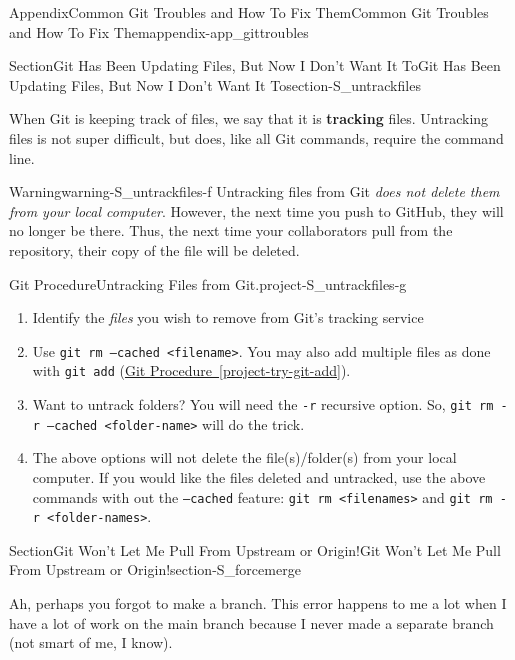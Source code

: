 \documentclass[oneside,10pt,]{book}
\newcommand{\xreffont}{\relax}
\newcommand{\mono}[1]{\texttt{#1}}
\newcommand{\terminology}[1]{\textbf{#1}}
\begin{document}
\begin{appendixptx}{Appendix}{Common Git Troubles and How To Fix Them}{}{Common Git Troubles and How To Fix Them}{}{}{appendix-app_gittroubles}
\begin{sectionptx}{Section}{Git Has Been Updating Files, But Now I Don't Want It To}{}{Git Has Been Updating Files, But Now I Don't Want It To}{}{}{section-S_untrackfiles}
\par
When Git is keeping track of files, we say that it is \terminology{tracking} files. Untracking files is not super difficult, but does, like all Git commands, require the command line.%
\begin{warning}{Warning}{}{warning-S_untrackfiles-f}%
Untracking files from Git \emph{does not delete them from your local computer}. However, the next time you push to GitHub, they will no longer be there. Thus, the next time your collaborators pull from the repository, their copy of the file will be deleted.%
\end{warning}
\begin{project}{Git Procedure}{Untracking Files from Git.}{project-S_untrackfiles-g}%
\begin{enumerate}[font=\bfseries,label=(\alph*),ref=\alph*]%
\item{}Identify the \emph{files} you wish to remove from Git's tracking service%
\item{}Use \mono{git rm --cached <filename>}. You may also add multiple files as done with \mono{git add} (\hyperref[project-try-git-add]{Git Procedure~{\xreffont\ref{project-try-git-add}}}).%
\item{}Want to untrack folders? You will need the \mono{-r} recursive option. So, \mono{git rm -r --cached <folder-name>} will do the trick.%
\item{}The above options will not delete the file(s)\slash{}folder(s) from your local computer. If you would like the files deleted and untracked, use the above commands with out the \mono{--cached} feature: \mono{git rm <filenames>} and \mono{git rm -r <folder-names>}.%
\end{enumerate}%
\end{project}%
\end{sectionptx}
%
%
\typeout{************************************************}
\typeout{************************************************}
%
\begin{sectionptx}{Section}{Git Won't Let Me Pull From Upstream or Origin!}{}{Git Won't Let Me Pull From Upstream or Origin!}{}{}{section-S_forcemerge}
%
%
%
%
%
\begin{introduction}{}%
Ah, perhaps you forgot to make a branch. This error happens to me a lot when I have a lot of work on the main branch because I never made a separate branch (not smart of me, I know).%

\end{introduction}
\end{sectionptx}
\end{appendixptx}
\end{document}
